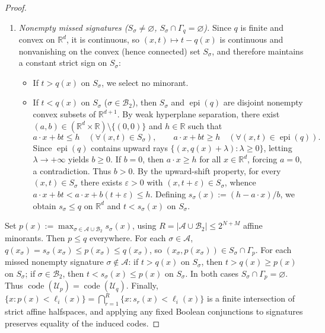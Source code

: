 \documentclass[11pt]{article}
\theoremstyle{plain}
\theoremstyle{definition}
\theoremstyle{remark}
\DeclareMathOperator{\code}{code}
\DeclareMathOperator{\epi}{epi}
\begin{document}
\begin{proof}
\begin{enumerate}[label=\textup{(\arabic*)}]
\item \emph{Nonempty missed signatures ($S_\sigma \neq \varnothing$, $S_\sigma \cap \Gamma_q = \varnothing$).} Since $q$ is finite and convex on $\mathbb{R}^d$, it is continuous, so $(x, t) \mapsto t - q(x)$ is continuous and nonvanishing on the convex (hence connected) set $S_\sigma$, and therefore maintains a constant strict sign on $S_\sigma$:
\begin{itemize}[leftmargin=1.5em]
\item If $t > q(x)$ on $S_\sigma$, we select no minorant.
\item If $t < q(x)$ on $S_\sigma$ ($\sigma \in \mathcal{B}_2$), then $S_\sigma$ and $\epi(q)$ are disjoint nonempty convex subsets of $\mathbb{R}^{d+1}$. By weak hyperplane separation, there exist $(a, b) \in (\mathbb{R}^d \times \mathbb{R}) \setminus \{(0, 0)\}$ and $h \in \mathbb{R}$ such that
\[
a \cdot x + bt \le h \quad (\forall (x, t) \in S_\sigma), \qquad a \cdot x + bt \ge h \quad (\forall (x, t) \in \epi(q)).
\]
Since $\epi(q)$ contains upward rays $\{(x, q(x) + \lambda) : \lambda \ge 0\}$, letting $\lambda \to +\infty$ yields $b \ge 0$. If $b = 0$, then $a \cdot x \ge h$ for all $x \in \mathbb{R}^d$, forcing $a = 0$, a contradiction. Thus $b > 0$. By the upward-shift property, for every $(x, t) \in S_\sigma$ there exists $\varepsilon > 0$ with $(x, t + \varepsilon) \in S_\sigma$, whence $a \cdot x + bt < a \cdot x + b(t + \varepsilon) \le h$. Defining $s_\sigma(x) := (h - a \cdot x)/b$, we obtain $s_\sigma \le q$ on $\mathbb{R}^d$ and $t < s_\sigma(x)$ on $S_\sigma$.
\end{itemize}
\end{enumerate}

Set $p(x) := \max_{\sigma \in \mathcal{A} \cup \mathcal{B}_2} s_\sigma(x)$, using $R = |\mathcal{A} \cup \mathcal{B}_2| \le 2^{N+M}$ affine minorants. Then $p \le q$ everywhere. For each $\sigma \in \mathcal{A}$, $q(x_\sigma) = s_\sigma(x_\sigma) \le p(x_\sigma) \le q(x_\sigma)$, so $(x_\sigma, p(x_\sigma)) \in S_\sigma \cap \Gamma_p$. For each missed nonempty signature $\sigma \notin \mathcal{A}$: if $t > q(x)$ on $S_\sigma$, then $t > q(x) \ge p(x)$ on $S_\sigma$; if $\sigma \in \mathcal{B}_2$, then $t < s_\sigma(x) \le p(x)$ on $S_\sigma$. In both cases $S_\sigma \cap \Gamma_p = \varnothing$. Thus $\code(\mathcal{U}_p) = \code(\mathcal{U}_q)$. Finally, $\{x : p(x) < \ell_i(x)\} = \bigcap_{r=1}^R \{x : s_r(x) < \ell_i(x)\}$ is a finite intersection of strict affine halfspaces, and applying any fixed Boolean conjunctions to signatures preserves equality of the induced codes.
\end{proof}
\end{document}
